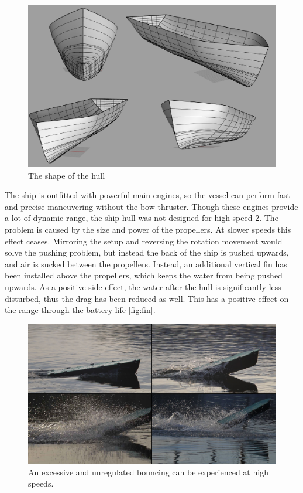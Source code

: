 \begin{figure}[htbp]
	\centering
	\includegraphics[width=\textwidth]{img/render/rendermontage.png}
	\caption{The shape of the hull}
	\label{fig:hullshape}
\end{figure}

The ship is outfitted with powerful main engines, so the vessel can perform fast and precise maneuvering without the bow thruster. Though these engines provide a lot of dynamic range, the ship hull was not designed for high speed \ref{fig:jumping}. The problem is caused by the size and power of the propellers. At slower speeds this effect ceases.
Mirroring the setup and reversing the rotation movement would solve the pushing problem, but instead the back of the ship is pushed upwards, and air is sucked between the propellers. Instead, an additional vertical fin has been installed above the propellers, which keeps the water from being pushed upwards. As a positive side effect, the water after the hull is significantly less disturbed, thus the drag has been reduced as well. This has a positive effect on the range through the battery life \ref{fig:fin}.

\begin{figure}[htbp]
	\centering
	\includegraphics[width=\textwidth]{Pictures/VerticalJumpingTele.jpg}
	\caption{An excessive and unregulated bouncing can be experienced at high speeds.}
	\label{fig:jumping}
\end{figure}

